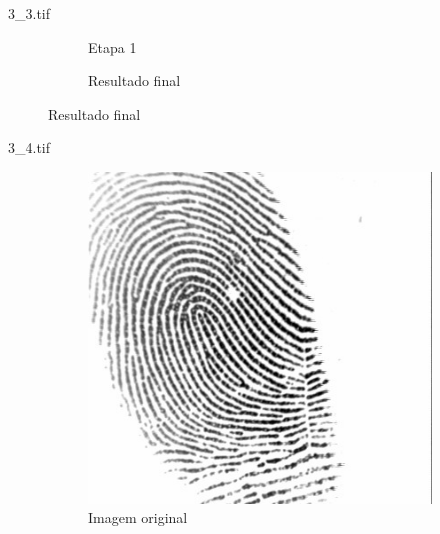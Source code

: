\documentclass{beamer}
\begin{document}
\begin{frame}{3\_3.tif}
\begin{figure}
\begin{subfigure}[!ht]{0.32\textwidth}
                \caption{Etapa 1}
            \end{subfigure}
            \begin{subfigure}[!ht]{0.32\textwidth}
                \caption{Resultado final}
            \end{subfigure}
        \end{figure}
    \end{frame}

    \begin{frame}{3\_4.tif}
        \begin{figure}
            \centering
            \begin{subfigure}[!ht]{0.32\textwidth}
                \includegraphics[width=\columnwidth]{Fingerprints/3_4.jpg}
                \caption{Imagem original}
            \end{subfigure}
            \begin{subfigure}[!ht]{0.32\textwidth}

\end{subfigure}
\end{figure}
\end{frame}
\end{document}
